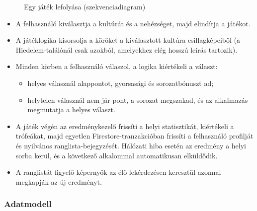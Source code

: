 \documentclass[12pt,a4paper]{article}
\begin{document}
\begin{figure}[htbp]
  \caption{Egy játék lefolyása (szekvenciadiagram)}
  \label{fig:szekvencia}
\end{figure}

\begin{itemize}
  \item A felhasználó kiválasztja a kultúrát és a nehézséget, majd elindítja a játékot.
  \item A játéklogika kisorsolja a köröket a kiválasztott kultúra csillagképeiből (a
        Hiedelem-találónál csak azokból, amelyekhez elég hosszú leírás tartozik).
  \item Minden körben a felhasználó válaszol, a logika kiértékeli a választ:
        \begin{itemize}
          \item helyes válasznál alappontot, gyorsasági és sorozatbónuszt ad;
          \item helytelen válasznál nem jár pont, a sorozat megszakad, és az alkalmazás megmutatja
                a helyes választ.
        \end{itemize}
  \item A játék végén az eredménykezelő frissíti a helyi statisztikát, kiértékeli a trófeákat,
        majd egyetlen Firestore-tranzakcióban frissíti a felhasználó profilját és nyilvános
        ranglista-bejegyzését. Hálózati hiba esetén az eredmény a helyi sorba kerül, és a
        következő alkalommal automatikusan elküldődik.
  \item A ranglistát figyelő képernyők az élő lekérdezésen keresztül azonnal megkapják az új
        eredményt.
\end{itemize}

\subsubsection*{Adatmodell}
\end{document}
